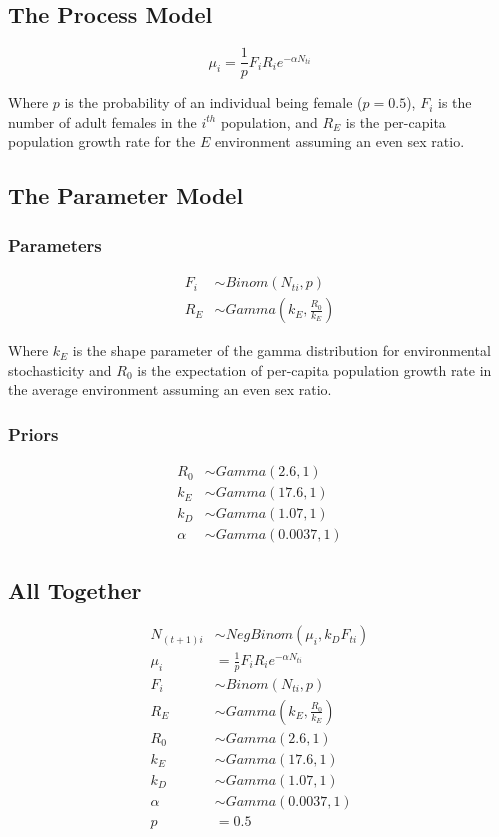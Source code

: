 \documentclass{article}[12pt]
\begin{document}
\subsection*{The Process Model}

\[
\mu_i = \frac{1}{p}F_iR_ie^{-\alpha N_{ti}}
\]

Where $p$ is the probability of an individual being female ($p=0.5$), $F_i$ is the number of adult females in the $i^{th}$ population, and $R_E$ is the per-capita population growth rate for the $E$ environment assuming an even sex ratio.

\subsection*{The Parameter Model}

\subsubsection*{Parameters}

\begin{align*}
F_i & \sim Binom(N_{ti}, p) \\
R_E & \sim Gamma(k_E, \frac{R_0}{k_E})
\end{align*}

Where $k_E$ is the shape parameter of the gamma distribution for environmental stochasticity and $R_0$ is the expectation of per-capita population growth rate in the average environment assuming an even sex ratio.

\subsubsection*{Priors}

\begin{align*}
R_0 & \sim  Gamma(2.6, 1) \\
k_E & \sim Gamma(17.6, 1) \\
k_D & \sim Gamma(1.07, 1) \\
\alpha & \sim Gamma(0.0037, 1)
\end{align*}

\subsection*{All Together}

\begin{align*}
N_{(t+1)i} & \sim NegBinom(\mu_i, k_DF_{ti}) \\
\mu_i & = \frac{1}{p}F_iR_ie^{-\alpha N_{ti}} \\
F_i & \sim Binom(N_{ti}, p) \\
R_E & \sim Gamma(k_E, \frac{R_0}{k_E}) \\
R_0 & \sim  Gamma(2.6, 1) \\
k_E & \sim Gamma(17.6, 1) \\
k_D & \sim Gamma(1.07, 1) \\
\alpha & \sim Gamma(0.0037, 1) \\
p & = 0.5
\end{align*}
\end{document}
